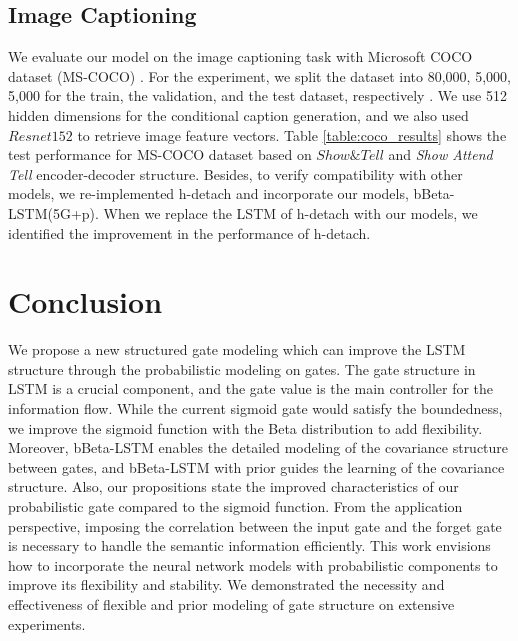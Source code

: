 \documentclass[letterpaper]{article} %
\begin{document}
\subsection{Image Captioning} %
We evaluate our model on the image captioning task with Microsoft COCO dataset (MS-COCO) \cite{MSCOCO2014}. For the experiment, we split the dataset into 80,000, 5,000, 5,000 for the train, the validation, and the test dataset, respectively \cite{karpathy2015deep}. We use 512 hidden dimensions for the conditional caption generation, and we also used $Resnet152$ to retrieve image feature vectors.
Table \ref{table:coco_results} shows the test performance for MS-COCO dataset based on $Show\&Tell$ \cite{vinyals2015show} and \emph{Show Attend Tell} \cite{xu2015show} encoder-decoder structure.
Besides, to verify compatibility with other models, we re-implemented h-detach \cite{hdetach2019} and incorporate our models, bBeta-LSTM(5G+p).
When we replace the LSTM of h-detach with our models, we identified the improvement in the performance of h-detach.

\section{Conclusion}
We propose a new structured gate modeling which can improve the LSTM structure through the probabilistic modeling on gates.
The gate structure in LSTM is a crucial component, and the gate value is the main controller for the information flow.
While the current sigmoid gate would satisfy the boundedness, we improve the sigmoid function with the Beta distribution to add flexibility. Moreover, bBeta-LSTM enables the detailed modeling of the covariance structure between gates, and bBeta-LSTM with prior guides the learning of the covariance structure.
Also, our propositions state the improved characteristics of our probabilistic gate compared to the sigmoid function.
From the application perspective, imposing the correlation between the input gate and the forget gate is necessary to handle the semantic information efficiently.
This work envisions how to incorporate the neural network models with probabilistic components to improve its flexibility and stability. We demonstrated the necessity and effectiveness of flexible and prior modeling of gate structure on extensive experiments.
\end{document}
